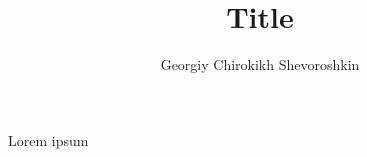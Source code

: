 \documentclass{article}
\title{Title}
\author{Georgiy Chirokikh Shevoroshkin}
\date{}
\begin{document}
\maketitle

\section{}
Lorem ipsum

\printbibliography
\end{document}
